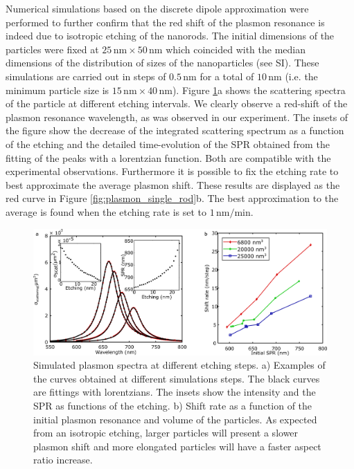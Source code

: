 \documentclass[a4paper,oneside,onecolumn]{article}
\newcommand{\nm}{\ensuremath{\,\textrm{nm}}}
\begin{document}
Numerical simulations based on the discrete dipole approximation were
performed to further confirm that the red shift of the plasmon resonance is
indeed due to isotropic etching of the nanorods. The initial dimensions of the
particles were fixed at $25\nm\times50\nm$ which coincided with the median
dimensions of the distribution of sizes of the nanoparticles (see SI). These
simulations are carried out in steps of $0.5\nm$ for a total of $10\nm$ (i.e.
the minimum particle size is $15\nm\times 40 \nm$). Figure
\ref{fig:simulations}a shows the scattering spectra of the particle at
different etching intervals. We clearly observe a red-shift of the plasmon
resonance wavelength, as was observed in our experiment. The insets of the
figure show the decrease of the integrated scattering spectrum as a function of
the etching and the detailed time-evolution of the SPR obtained from the fitting
of the peaks with a lorentzian function. Both are compatible with the
experimental observations. Furthermore it is possible to fix the etching rate to
best approximate the average plasmon shift. These results are displayed as the
red curve in Figure \ref{fig:plasmon_single_rod}b. The best approximation to
the average is found when the etching rate is set to $1\nm/\textrm{min}$.

\begin{figure}[p]
 \centering
 \includegraphics[width=0.95\linewidth]{Figures/02_Simulations/simulations.png}
 \caption{Simulated plasmon spectra at different etching steps. a) Examples of
 the curves obtained at different simulations steps. The black curves are
 fittings with lorentzians. The insets show the intensity and the SPR as
 functions of the etching. b) Shift rate as a function of the initial
 plasmon resonance and volume of the particles. As expected from an isotropic etching, larger particles will present a slower plasmon shift and more elongated particles will have a faster aspect ratio increase.}
 \label{fig:simulations}
\end{figure}
\end{document}
